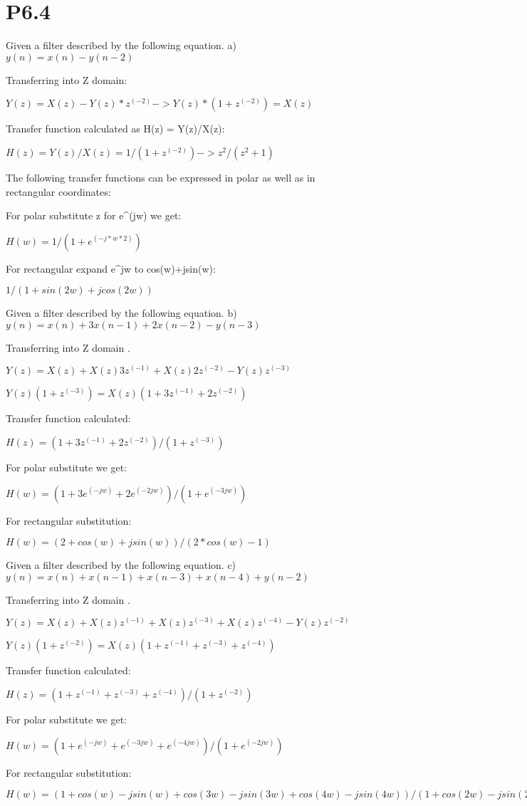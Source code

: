 \chapter{P6.4}

Given a filter described by the following equation.
a) $y(n)= x(n)-y(n-2)$

Transferring into Z domain:

$ Y(z) = X(z)-Y(z)*z^(-2) ->  Y(z)*(1+z^(-2)) = X(z)$

Transfer function calculated as H(z) = Y(z)/X(z):

$ H(z) = Y(z)/X(z) =  1/(1+z^(-2)) -> z^2/(z^2+1) $

The following transfer functions can be expressed in polar as well as in rectangular coordinates:

For polar substitute z for e^(jw) we get:
 
$ H(w) = 1/(1+e^(-j*w*2)) $

For rectangular expand e^jw to cos(w)+jsin(w):

$ 1/(1+sin(2w)+jcos(2w)) $

Given a filter described by the following equation.
b) $y(n)= x(n) + 3x(n-1) + 2x(n-2) - y(n-3)$

Transferring into Z domain .

$ Y(z) = X(z) + X(z)3z^(-1) + X(z)2z^(-2) - Y(z)z^(-3) $

$ Y(z)(1+z^(-3)) = X(z)(1+3z^(-1)+2z^(-2))$

Transfer function calculated:

$ H(z)= (1+3z^(-1)+2z^(-2))/(1+z^(-3)) $

For polar substitute we get:

$ H(w) = (1+3e^(-jw)+2e^(-2jw))/(1+e^(-3jw))$

For rectangular substitution:

$ H(w) = (2 + cos(w) + jsin(w))/(2*cos(w)-1) $

Given a filter described by the following equation.
c) $y(n)= x(n) + x(n-1) + x(n-3) + x(n-4) +  y(n-2)$

Transferring into Z domain .

$ Y(z) = X(z) + X(z)z^(-1) + X(z)z^(-3) + X(z)z^(-4) - Y(z)z^(-2) $

$ Y(z)(1+z^(-2)) = X(z)(1 + z^(-1) + z^(-3) + z^(-4))$

Transfer function calculated:

$ H(z)= (1+z^(-1)+z^(-3)+z^(-4))/(1+z^(-2)) $

For polar substitute we get:

$ H(w) = (1+e^(-jw)+e^(-3jw)+e^(-4jw))/(1+e^(-2jw))$

For rectangular substitution:

$ H(w) = (1+cos(w)-jsin(w)+cos(3w)-jsin(3w)+cos(4w)-jsin(4w))/
		  (1 + cos(2w)-jsin(2w)) $


